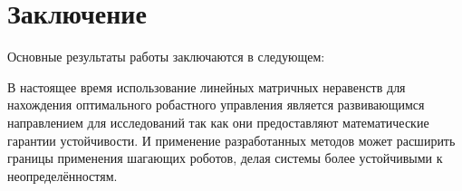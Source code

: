 \chapter*{Заключение}                       %


Основные результаты работы заключаются в следующем:


В настоящее время использование линейных матричных неравенств для нахождения оптимального робастного управления является развивающимся направлением для исследований так как они предоставляют математические гарантии устойчивости. И применение разработанных методов может расширить границы применения шагающих роботов, делая системы более устойчивыми к неопределённостям.  
